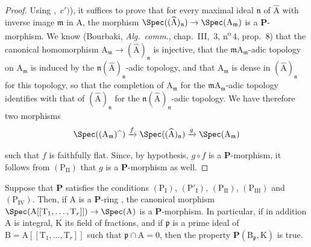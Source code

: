 \begin{proof}
Using ,~$c')$), it suffices to prove that for every maximal ideal $\mathfrak{n}$ of $\widehat{\mathrm{A}}$ with inverse image $\mathfrak{m}$ in $\mathrm{A}$, the morphism $\Spec((\widehat{\mathrm{A}})_\mathfrak{n})\to\Spec(\mathrm{A}_\mathfrak{m})$ is a $\boldsymbol{P}$-morphism.
We know (Bourbaki, \emph{Alg.\ comm.}, chap.~III, \textsection\,3, n\textsuperscript{o}\,4, prop.~8) that the canonical homomorphism $\mathrm{A}_\mathfrak{m}\to(\widehat{\mathrm{A}})_\mathfrak{n}$ is injective, that the $\mathfrak{m}\mathrm{A}_\mathfrak{m}$-adic topology on $\mathrm{A}_\mathfrak{m}$ is induced by the $\mathfrak{n}(\widehat{\mathrm{A}})_\mathfrak{n}$-adic topology, and that $\mathrm{A}_\mathfrak{m}$ is dense in $(\widehat{\mathrm{A}})_\mathfrak{n}$ for this topology, so that the completion of $\mathrm{A}_\mathfrak{m}$ for the $\mathfrak{m}\mathrm{A}_\mathfrak{m}$-adic topology identifies with that of $(\widehat{\mathrm{A}})_\mathfrak{n}$ for the $\mathfrak{n}(\widehat{\mathrm{A}})_\mathfrak{n}$-adic topology.
We have therefore two morphisms
\[
  \Spec((\mathrm{A}_\mathfrak{m})\widehat{\phantom{x}})\xrightarrow{f}\Spec((\widehat{\mathrm{A}})_\mathfrak{n})\xrightarrow{g}\Spec(\mathrm{A}_\mathfrak{m})
\]


such that $f$ is faithfully flat. Since, by hypothesis, $g\circ f$ is a $\boldsymbol{P}$-morphism, it follows from $(\mathrm{P_{II}})$ that $g$ is a $\boldsymbol{P}$-morphism as well.
\end{proof}

\begin{corollary}[7.4.7]
\label{IV.7.4.7}
Suppose that $\boldsymbol{P}$ satisfies the conditions $(\mathrm{P_I})$, $(\mathrm{P}'_\mathrm{I})$, $(\mathrm{P_{II}})$, $(\mathrm{P_{III}})$ and $(\mathrm{P_{IV}})$.
Then, if $\mathrm{A}$ is a $\boldsymbol{P}$-ring , the canonical morphism $\Spec(\mathrm{A}[[\mathrm{T}_1,\ldots,\mathrm{T}_r]])\to\Spec(\mathrm{A})$ is a $\boldsymbol{P}$-morphism.
In particular, if in addition $\mathrm{A}$ is integral, $\mathrm{K}$ its field of fractions, and if $\mathfrak{p}$ is a prime ideal of $\mathrm{B}=\mathrm{A}[[\mathrm{T}_1,\ldots,\mathrm{T}_r]]$ such that $\mathfrak{p}\cap\mathrm{A}=0$, then the property $\boldsymbol{P}(\mathrm{B}_\mathfrak{p},\mathrm{K})$ is true.
\end{corollary}

